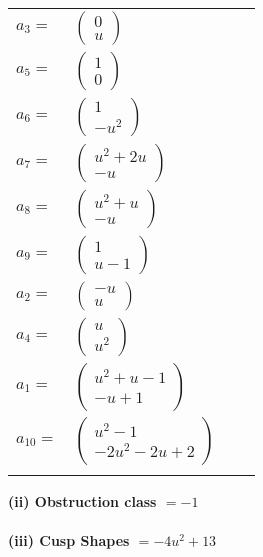 \documentclass[1p]{elsarticle_modified}
\theoremstyle{definition}
\begin{document}
\begin{tabular}{m{7pt} m{180pt} m{7pt} m{180pt} }
\flushright $a_{3}=$&$\begin{pmatrix}0\\u\end{pmatrix}$ \\
\flushright $a_{5}=$&$\begin{pmatrix}1\\0\end{pmatrix}$ \\
\flushright $a_{6}=$&$\begin{pmatrix}1\\- u^2\end{pmatrix}$ \\
\flushright $a_{7}=$&$\begin{pmatrix}u^2+2 u\\- u\end{pmatrix}$ \\
\flushright $a_{8}=$&$\begin{pmatrix}u^2+u\\- u\end{pmatrix}$ \\
\flushright $a_{9}=$&$\begin{pmatrix}1\\u-1\end{pmatrix}$ \\
\flushright $a_{2}=$&$\begin{pmatrix}- u\\u\end{pmatrix}$ \\
\flushright $a_{4}=$&$\begin{pmatrix}u\\u^2\end{pmatrix}$ \\
\flushright $a_{1}=$&$\begin{pmatrix}u^2+u-1\\- u+1\end{pmatrix}$ \\
\flushright $a_{10}=$&$\begin{pmatrix}u^2-1\\-2 u^2-2 u+2\end{pmatrix}$\\&\end{tabular}
\flushleft \textbf{(ii) Obstruction class $= -1$}\\~\\
\flushleft \textbf{(iii) Cusp Shapes $= -4 u^2+13$}\\~\\
\end{document}
